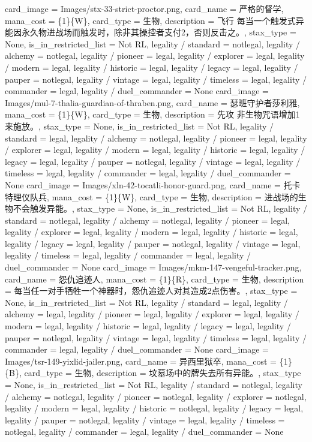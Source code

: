 \documentclass[lang = cn, color = black, 10pt]{AllThatStax}
\begin{document}
\card
{
	card_image = Images/stx-33-strict-proctor.png,
	card_name = 严格的督学,
	mana_cost = \{1\}\{W\},
	card_type = 生物,
	description = 飞行
	每当一个触发式异能因永久物进战场而触发时，除非其操控者支付{2}，否则反击之。,
	stax_type = None,
	is_in_restricted_list = Not RL,
	legality / standard = notlegal,
	legality / alchemy = notlegal,
	legality / pioneer = legal,
	legality / explorer = legal,
	legality / modern = legal,
	legality / historic = legal,
	legality / legacy = legal,
	legality / pauper = notlegal,
	legality / vintage = legal,
	legality / timeless = legal,
	legality / commander = legal,
	legality / duel_commander = None
}
\card
{
	card_image = Images/mul-7-thalia-guardian-of-thraben.png,
	card_name = 瑟班守护者莎利雅,
	mana_cost = \{1\}\{W\},
	card_type = 生物,
	description = 先攻
	非生物咒语增加{1}来施放。,
	stax_type = None,
	is_in_restricted_list = Not RL,
	legality / standard = legal,
	legality / alchemy = notlegal,
	legality / pioneer = legal,
	legality / explorer = legal,
	legality / modern = legal,
	legality / historic = legal,
	legality / legacy = legal,
	legality / pauper = notlegal,
	legality / vintage = legal,
	legality / timeless = legal,
	legality / commander = legal,
	legality / duel_commander = None
}
\card
{
	card_image = Images/xln-42-tocatli-honor-guard.png,
	card_name = 托卡特理仪队兵,
	mana_cost = \{1\}\{W\},
	card_type = 生物,
	description = 进战场的生物不会触发异能。,
	stax_type = None,
	is_in_restricted_list = Not RL,
	legality / standard = notlegal,
	legality / alchemy = notlegal,
	legality / pioneer = legal,
	legality / explorer = legal,
	legality / modern = legal,
	legality / historic = legal,
	legality / legacy = legal,
	legality / pauper = notlegal,
	legality / vintage = legal,
	legality / timeless = legal,
	legality / commander = legal,
	legality / duel_commander = None
}
\card
{
	card_image = Images/mkm-147-vengeful-tracker.png,
	card_name = 怨仇追迹人,
	mana_cost = \{1\}\{R\},
	card_type = 生物,
	description = 每当任一对手牺牲一个神器时，怨仇追迹人对其造成2点伤害。,
	stax_type = None,
	is_in_restricted_list = Not RL,
	legality / standard = legal,
	legality / alchemy = legal,
	legality / pioneer = legal,
	legality / explorer = legal,
	legality / modern = legal,
	legality / historic = legal,
	legality / legacy = legal,
	legality / pauper = notlegal,
	legality / vintage = legal,
	legality / timeless = legal,
	legality / commander = legal,
	legality / duel_commander = None
}
\card
{
	card_image = Images/tsr-149-yixlid-jailer.png,
	card_name = 异西里狱卒,
	mana_cost = \{1\}\{B\},
	card_type = 生物,
	description = 坟墓场中的牌失去所有异能。,
	stax_type = None,
	is_in_restricted_list = Not RL,
	legality / standard = notlegal,
	legality / alchemy = notlegal,
	legality / pioneer = notlegal,
	legality / explorer = notlegal,
	legality / modern = legal,
	legality / historic = notlegal,
	legality / legacy = legal,
	legality / pauper = notlegal,
	legality / vintage = legal,
	legality / timeless = notlegal,
	legality / commander = legal,
	legality / duel_commander = None
}
\end{document}
